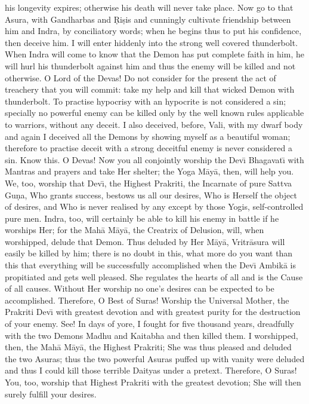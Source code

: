 his longevity expires; otherwise his death will never take place. Now go to that Asura, with Gandharbas and \d{R}i\d{s}is and cunningly cultivate friendship between him and Indra, by conciliatory words; when he begins thus to put his confidence, then deceive him. I will enter hiddenly into the strong well covered thunderbolt. When Indra will come to know that the Demon has put complete faith in him, he will hurl his thunderbolt against him and thus the enemy will be killed and not otherwise. O Lord of the Devas! Do not consider for the present the act of treachery that you will commit: take my help and kill that wicked Demon with thunderbolt. To practise hypocrisy with an hypocrite is not considered a sin; specially no powerful enemy can be killed only by the well known rules applicable to warriors, without any deceit. I also deceived, before, Vali, with my dwarf body and again I deceived all the Demons by showing myself as a beautiful woman; therefore to practise deceit with a strong deceitful enemy is never considered a sin. Know this. O Devas! Now you all conjointly worship the Dev\={\i} Bhagavat\={\i} with Mantras and prayers and take Her shelter; the Yoga M\=ay\=a, then, will help you. We, too, worship that Dev\={\i}, the Highest Prakriti, the Incarnate of pure Sattva Gu\d{n}a, Who grants success, bestows us all our desires, Who is Herself the object of desires, and Who is never realised by any except by those Yogis, self-controlled pure men. Indra, too, will certainly be able to kill his enemy in battle if he worships Her; for the Mah\=a M\=ay\=a, the Creatrix of Delusion, will, when worshipped, delude that Demon. Thus deluded by Her M\=ay\=a, Vritr\=asura will easily be killed by him; there is no doubt in this, what more do you want than this that everything will be successfully accomplished when the Dev\={\i} Ambik\=a is propitiated and gets well pleased. She regulates the hearts of all and is the Cause of all causes. Without Her worship no one's desires can be expected to be accomplished. Therefore, O Best of Suras! Worship the Universal Mother, the Prakriti Dev\={\i} with greatest devotion and with greatest purity for the destruction of your enemy. See! In days of yore, I fought for five thousand years, dreadfully with the two Demons Madhu and Kaitabha and then killed them. I worshipped, then, the Mah\=a M\=ay\=a, the Highest Prakriti; She was thus pleased and deluded the two Asuras; thus the two powerful Asuras puffed up with vanity were deluded and thus I could kill those terrible Daityas under a pretext. Therefore, O Suras! You, too, worship that Highest Prakriti with the greatest devotion; She will then surely fulfill your desires.

